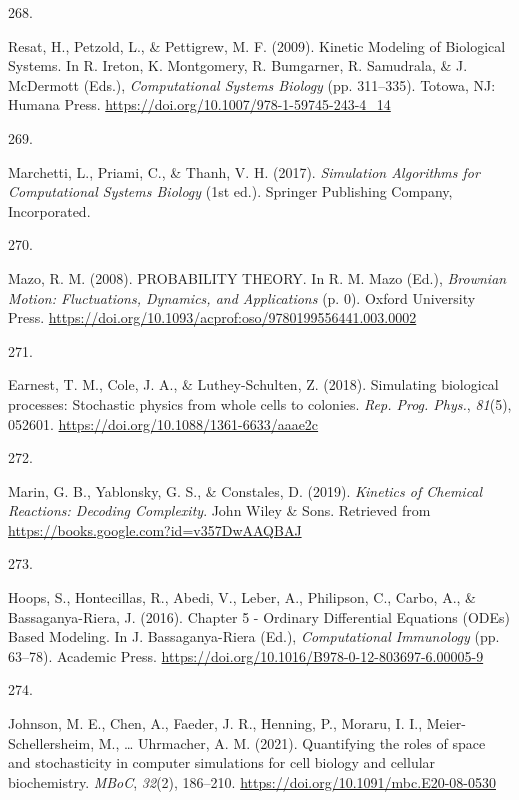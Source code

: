 \documentclass[
  11pt,
  letterpaper,
]{scrreprt}
\newlength{\cslhangindent}
\newlength{\csllabelwidth}
\newenvironment{CSLReferences}[2] %
 {\begin{list}{}{%
  \setlength{\itemindent}{0pt}
  \setlength{\leftmargin}{0pt}
  \setlength{\parsep}{0pt}
  \ifodd #1
   \setlength{\leftmargin}{\cslhangindent}
   \setlength{\itemindent}{-1\cslhangindent}
  \fi
  \setlength{\itemsep}{#2\baselineskip}}}
 {\end{list}}
\newcommand{\CSLLeftMargin}[1]{\parbox[t]{\csllabelwidth}{\strut#1\strut}}
\newcommand{\CSLRightInline}[1]{\parbox[t]{\linewidth - \csllabelwidth}{\strut#1\strut}}
\begin{document}
\begin{CSLReferences}{0}{0}
\CSLLeftMargin{268. }%
\CSLRightInline{Resat, H., Petzold, L., \& Pettigrew, M. F. (2009).
Kinetic {Modeling} of {Biological Systems}. In R. Ireton, K. Montgomery,
R. Bumgarner, R. Samudrala, \& J. McDermott (Eds.), \emph{Computational
{Systems Biology}} (pp. 311--335). Totowa, NJ: Humana Press.
\url{https://doi.org/10.1007/978-1-59745-243-4_14}}

\CSLLeftMargin{269. }%
\CSLRightInline{Marchetti, L., Priami, C., \& Thanh, V. H. (2017).
\emph{Simulation {Algorithms} for {Computational Systems Biology}} (1st
ed.). Springer Publishing Company, Incorporated.}

\CSLLeftMargin{270. }%
\CSLRightInline{Mazo, R. M. (2008). {PROBABILITY THEORY}. In R. M. Mazo
(Ed.), \emph{Brownian {Motion}: {Fluctuations}, {Dynamics}, and
{Applications}} (p. 0). Oxford University Press.
\url{https://doi.org/10.1093/acprof:oso/9780199556441.003.0002}}

\CSLLeftMargin{271. }%
\CSLRightInline{Earnest, T. M., Cole, J. A., \& Luthey-Schulten, Z.
(2018). Simulating biological processes: Stochastic physics from whole
cells to colonies. \emph{Rep. Prog. Phys.}, \emph{81}(5), 052601.
\url{https://doi.org/10.1088/1361-6633/aaae2c}}

\CSLLeftMargin{272. }%
\CSLRightInline{Marin, G. B., Yablonsky, G. S., \& Constales, D. (2019).
\emph{Kinetics of {Chemical Reactions}: {Decoding Complexity}}. John
Wiley \& Sons. Retrieved from
\url{https://books.google.com?id=v357DwAAQBAJ}}

\CSLLeftMargin{273. }%
\CSLRightInline{Hoops, S., Hontecillas, R., Abedi, V., Leber, A.,
Philipson, C., Carbo, A., \& Bassaganya-Riera, J. (2016). Chapter 5 -
{Ordinary Differential Equations} ({ODEs}) {Based Modeling}. In J.
Bassaganya-Riera (Ed.), \emph{Computational {Immunology}} (pp. 63--78).
Academic Press.
\url{https://doi.org/10.1016/B978-0-12-803697-6.00005-9}}

\CSLLeftMargin{274. }%
\CSLRightInline{Johnson, M. E., Chen, A., Faeder, J. R., Henning, P.,
Moraru, I. I., Meier-Schellersheim, M., \ldots{} Uhrmacher, A. M.
(2021). Quantifying the roles of space and stochasticity in computer
simulations for cell biology and cellular biochemistry. \emph{MBoC},
\emph{32}(2), 186--210. \url{https://doi.org/10.1091/mbc.E20-08-0530}}


\end{CSLReferences}
\end{document}
